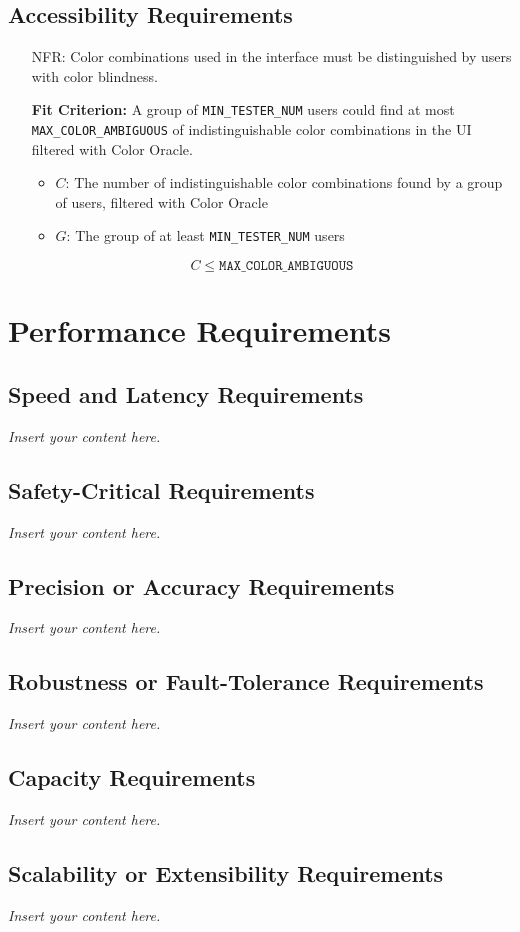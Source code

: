 \documentclass[12pt]{article}
\newcommand{\lips}{\textit{Insert your content here.}}
\newcounter{nfrnum} %
\newcommand{\rthenfrnum}{NFR\refstepcounter{nfrnum}\thenfrnum:}
\begin{document}
\subsection{Accessibility Requirements}
\begin{itemize}
\item[\rthenfrnum]
Color combinations used in the interface must be distinguished by users with color blindness.

\textbf{Fit Criterion:} A group of \texttt{MIN\_TESTER\_NUM} users could find at most \texttt{MAX\_COLOR\_AMBIGUOUS} of indistinguishable color combinations in the UI filtered with Color Oracle.
\begin{itemize}
    \item \( C \): The number of indistinguishable color combinations found by a group of users, filtered with Color Oracle
    \item \( G \): The group of at least \texttt{MIN\_TESTER\_NUM} users
\end{itemize}
\[
    C \leq \texttt{MAX\_COLOR\_AMBIGUOUS}
\]
\end{itemize}
\section{Performance Requirements}
\subsection{Speed and Latency Requirements}
\lips
\subsection{Safety-Critical Requirements}
\lips
\subsection{Precision or Accuracy Requirements}
\lips
\subsection{Robustness or Fault-Tolerance Requirements}
\lips
\subsection{Capacity Requirements}
\lips
\subsection{Scalability or Extensibility Requirements}
\lips
\end{document}
